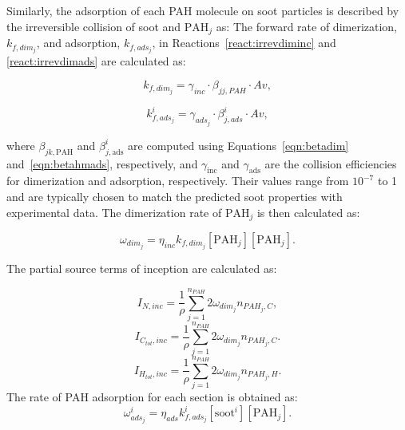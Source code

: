 Similarly, the adsorption of each PAH molecule on soot particles is described by the irreversible collision of soot and $\mathrm{PAH}_j$ as:
The forward rate of dimerization, ${k_{f,dim_j}}$, and adsorption, $k_{f,ads_j}$, in Reactions~\eqref{react:irrevdiminc} and \eqref{react:irrevdimads} are calculated as:

\begin{equation}
	k_{f,dim_j}=
	\gamma_{inc}\cdot\beta_{jj,PAH}\cdot Av
	\label{eqn:kfdim},
\end{equation}

\begin{equation}
	k^i_{f,ads_j}=
	\gamma_{ads_j}\cdot\beta^i_{j,ads}\cdot Av
	\label{eqn:kfads},
\end{equation}

\noindent where $\beta_{jk,\mathrm{PAH}}$ and $\beta^i_{j,\mathrm{ads}}$ are computed using Equations~\eqref{eqn:betadim} and~\eqref{eqn:betahmads}, respectively, and $\gamma_{\mathrm{inc}}$ and $\gamma_{\mathrm{ads}}$ are the collision efficiencies for dimerization and adsorption, respectively. Their values range from $\mathrm{10^{-7}}$ to 1 and are typically chosen to match the predicted soot properties with experimental data. The dimerization rate of $\mathrm{PAH}_j$ is then calculated as:

\begin{equation}
	\omega_{dim_j} = \eta_{inc} k_{f,dim_{j}} [\mathrm{PAH}_j] [\mathrm{PAH}_j].
	\label{eqn:irrevdim_wdim}
\end{equation}

The partial source terms of inception are calculated as:

\begin{equation}
	I_{N,inc} =\frac{1}{\rho} \sum_{j=1}^{n_{PAH}} 2\omega_{dim_j} n_{PAH_j,C},
	\label{eqn:INinc}
\end{equation}
\begin{equation}
	I_{C_{tot},inc} = \frac{1}{\rho}\sum_{j=1}^{n_{PAH}} 2\omega_{dim_j} n_{PAH_j,C}.
	\label{eqn:ICtotinc}
\end{equation}
\begin{equation}
	I_{H_{tot},inc} =\frac{1}{\rho} \sum_{j=1}^{n_{PAH}} 2\omega_{dim_j} n_{PAH_j,H}.
	\label{eqn:IHtotinc}
\end{equation}
The rate of PAH adsorption for each section is obtained as:
\begin{equation}
	\omega^i_{ads_j} = \eta_{ads} k^i_{f,ads_{j}} [\mathrm{soot}^i] [\mathrm{PAH}_j].
	\label{eqn:adsrate_irrevdim}
\end{equation}

